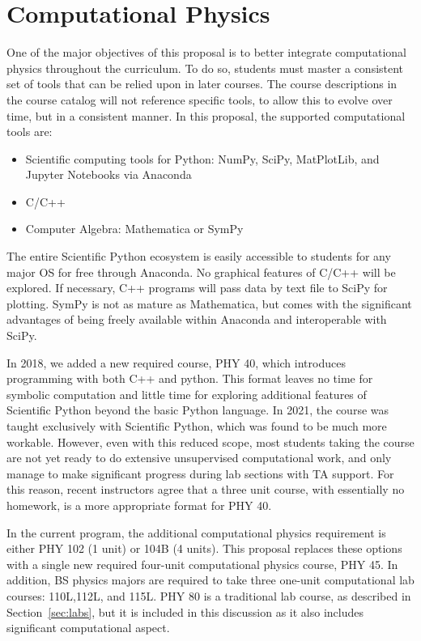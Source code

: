 \documentclass[12pt]{article}
\begin{document}
\section{Computational Physics}
\label{sec:computing}

One of the major objectives of this proposal is to better integrate
computational physics throughout the curriculum.  To do so, students
must master a consistent set of tools that can be relied upon in later
courses.  The course descriptions in the course catalog will not
reference specific tools, to allow this to evolve over time, but in a
consistent manner.  In this proposal, the supported computational
tools are:
\begin{itemize}
\item Scientific computing tools for Python: NumPy, SciPy, MatPlotLib,
  and Jupyter Notebooks via Anaconda
\item C/C++
\item Computer Algebra:  Mathematica or SymPy
\end{itemize}
The entire Scientific Python ecosystem is easily accessible to
students for any major OS for free through Anaconda.  No graphical
features of C/C++ will be explored.  If necessary, C++ programs will
pass data by text file to SciPy for plotting.  SymPy is not as mature
as Mathematica, but comes with the significant advantages of being
freely available within Anaconda and interoperable with SciPy.

In 2018, we added a new required course, PHY 40, which introduces
programming with both C++ and python.  This format leaves no time for
symbolic computation and little time for exploring additional features
of Scientific Python beyond the basic Python language.  In 2021, the
course was taught exclusively with Scientific Python, which was found
to be much more workable.  However, even with this reduced scope, most
students taking the course are not yet ready to do extensive
unsupervised computational work, and only manage to make significant
progress during lab sections with TA support.  For this reason, recent
instructors agree that a three unit course, with essentially no
homework, is a more appropriate format for PHY 40.

In the current program, the additional computational physics
requirement is either PHY 102 (1 unit) or 104B (4 units).  This
proposal replaces these options with a single new required four-unit
computational physics course, PHY 45.  In addition, BS physics majors
are required to take three one-unit computational lab courses:
110L,112L, and 115L.  PHY 80 is a traditional lab course, as described in
Section~\ref{sec:labs}, but it is included in this discussion as it
also includes significant computational aspect.
\end{document}

